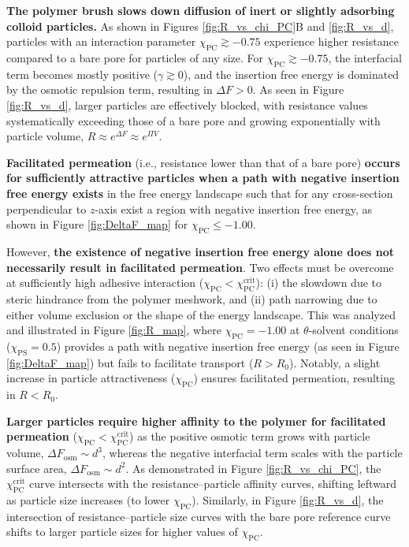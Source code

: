 \documentclass[12pt, a4paper]{article}
\begin{document}
\textbf{The polymer brush slows down diffusion of inert or slightly adsorbing colloid particles.}
As shown in Figures \ref{fig:R_vs_chi_PC}B and \ref{fig:R_vs_d}, particles with an interaction parameter $\chi_{\text{PC}} \gtrsim -0.75$ experience higher resistance compared to a bare pore for particles of any size.
For $\chi_{\text{PC}} \gtrsim -0.75$, the interfacial term becomes mostly positive ($\gamma \gtrsim 0$), and the insertion free energy is dominated by the osmotic repulsion term, resulting in $\Delta F > 0$.
As seen in Figure \ref{fig:R_vs_d}, larger particles are effectively blocked, with resistance values systematically exceeding those of a bare pore and growing exponentially with particle volume, $R \approx e^{\Delta F} \approx e^{\Pi V}$.

\textbf{Facilitated permeation} (i.e., resistance lower than that of a bare pore) \textbf{occurs for sufficiently attractive particles when a path with negative insertion free energy exists} in the free energy landscape such that for any cross-section perpendicular to $z$-axis exist a region with negative insertion free energy,
as shown in Figure \ref{fig:DeltaF_map} for $\chi_{\text{PC}} \le -1.00$.

However, \textbf{the existence of negative insertion free energy alone does not necessarily result in facilitated permeation}.
Two effects must be overcome at sufficiently high adhesive interaction ($\chi_{\text{PC}} < \chi^{\text{crit}}_{\text{PC}}$): (i) the slowdown due to steric hindrance from the polymer meshwork, and (ii) path narrowing due to either volume exclusion or the shape of the energy landscape.
This was analyzed and illustrated in Figure \ref{fig:R_map}, where $\chi_{\text{PC}} = -1.00$ at $\theta$-solvent conditions ($\chi_{\text{PS}} = 0.5$) provides a path with negative insertion free energy (as seen in Figure \ref{fig:DeltaF_map}) but fails to facilitate transport ($R > R_{0}$).
Notably, a slight increase in particle attractiveness ($\chi_{\text{PC}}$) ensures facilitated permeation, resulting in $R < R_{0}$.

\textbf{Larger particles require higher affinity to the polymer for facilitated permeation} ($\chi_{\text{PC}} < \chi^{\text{crit}}_{\text{PC}}$) as the positive osmotic term grows with particle volume, $\Delta F_{\text{osm}} \sim d^3$, whereas the negative interfacial term scales with the particle surface area, $\Delta F_{\text{osm}} \sim d^2$.
As demonstrated in Figure \ref{fig:R_vs_chi_PC}, the $\chi^{\text{crit}}_{\text{PC}}$ curve intersects with the resistance–particle affinity curves, shifting leftward as particle size increases (to lower $\chi_{\text{PC}}$).
Similarly, in Figure \ref{fig:R_vs_d}, the intersection of resistance–particle size curves with the bare pore reference curve shifts to larger particle sizes for higher values of $\chi_{\text{PC}}$.
\end{document}
